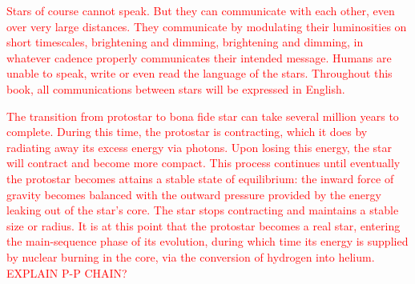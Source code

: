 \documentclass[main.tex]{subfiles}
\begin{document}
\begin{tcolorbox}[sharp corners, colback=red!30, colframe=red!80!blue, title=Stellar Communication$^{2}$]
\par \textcolor{red} {Stars of course cannot speak.  But they can communicate with each other, even over very large distances.  They communicate by modulating their luminosities on short timescales, brightening and dimming, brightening and dimming, in whatever cadence properly communicates their intended message.  Humans are unable to speak, write or even read the language of the stars.  Throughout this book, all communications between stars will be expressed in English.} 
\end{tcolorbox}

\begin{tcolorbox}[sharp corners, colback=red!30, colframe=red!80!blue, title=From Protostar to Bona Fide Star$^{3}$]
\par \textcolor{red} {The transition from protostar to bona fide star can take several million years to complete.  During this time, the protostar is contracting, which it does by radiating away its excess energy via photons.  Upon losing this energy, the star will contract and become more compact.  This process continues until eventually the protostar becomes attains a stable state of equilibrium:  the inward force of gravity becomes balanced with the outward pressure provided by the energy leaking out of the star's core.  The star stops contracting and maintains a stable size or radius.  It is at this point that the protostar becomes a real star, entering the main-sequence phase of its evolution, during which time its energy is supplied by nuclear burning in the core, via the conversion of hydrogen into helium. \\
EXPLAIN P-P CHAIN?}
\end{tcolorbox}
\end{document}
